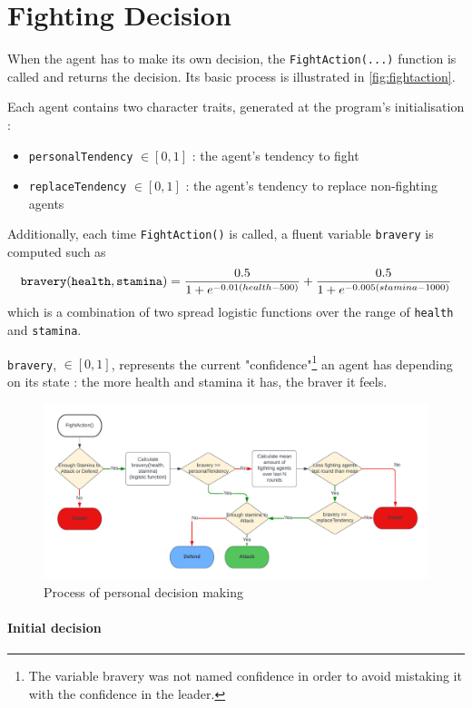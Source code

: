 \section{Fighting Decision}
When the agent has to make its own decision, the \verb|FightAction(...)| function is called and returns the decision. Its basic process is illustrated in \autoref{fig:fightaction}.

Each agent contains two character traits, generated at the program's initialisation : \begin{itemize}
    \item \verb|personalTendency| $\in[0,1]$ : the agent's tendency to fight
    \item \verb|replaceTendency| $\in[0,1]$ : the agent's tendency to replace non-fighting agents
\end{itemize}
Additionally, each time \verb|FightAction()| is called, a fluent variable \verb|bravery| is computed such as $$\verb|bravery|(\verb|health|, \verb|stamina|) = \frac{0.5}{1+e^{-0.01(health-500)}} + \frac{0.5}{1+e^{-0.005(stamina-1000)}}$$
which is a combination of two spread logistic functions over the range of \verb|health| and \verb|stamina|.

 \verb|bravery|, $\in [0,1]$, represents the current "confidence"\footnote{The variable bravery was not named confidence in order to avoid mistaking it with the confidence in the leader.} an agent has depending on its state : the more health and stamina it has, the braver it feels.

\begin{figure}[htb]
    \centering
    \includegraphics[width=0.8\linewidth]{005_team_2_agent_design/Resources/fightaction.png}
    \caption{Process of personal decision making}
    \label{fig:fightaction}
\end{figure}

 \paragraph{Initial decision}

